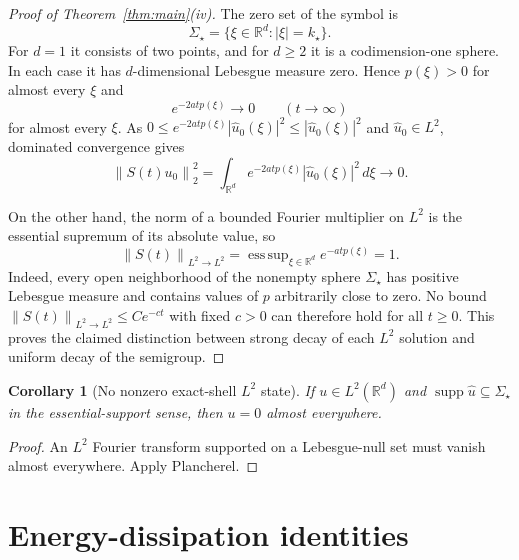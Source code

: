 \documentclass[11pt]{article}
\newtheorem{corollary}[theorem]{Corollary}
\theoremstyle{remark}
\newcommand{\R}{\mathbb{R}}
\newcommand{\norm}[1]{\left\lVert #1\right\rVert}
\newcommand{\abs}[1]{\left\lvert #1\right\rvert}
\DeclareMathOperator{\supp}{supp}
\DeclareMathOperator{\esssup}{ess\,sup}
\begin{document}
\begin{proof}[Proof of Theorem~\ref{thm:main}(iv)]
The zero set of the symbol is
\begin{equation}\label{eq:shell}
\Sigma_\star=\{\xi\in\R^d:\abs{\xi}=k_\star\}.
\end{equation}
For $d=1$ it consists of two points, and for $d\ge2$ it is a
codimension-one sphere.  In each case it has $d$-dimensional Lebesgue
measure zero.  Hence $p(\xi)>0$ for almost every $\xi$ and
\begin{equation}
e^{-2atp(\xi)}\longrightarrow0
\qquad(t\to\infty)
\end{equation}
for almost every $\xi$.  As
$0\le e^{-2atp(\xi)}\abs{\widehat u_0(\xi)}^2
\le\abs{\widehat u_0(\xi)}^2$ and $\widehat u_0\in L^2$, dominated
convergence gives
\begin{equation}
\norm{S(t)u_0}_2^2
=\int_{\R^d}e^{-2atp(\xi)}\abs{\widehat u_0(\xi)}^2\,d\xi
\longrightarrow0.
\end{equation}

On the other hand, the norm of a bounded Fourier multiplier on $L^2$
is the essential supremum of its absolute value, so
\begin{equation}
\norm{S(t)}_{L^2\to L^2}
=\esssup_{\xi\in\R^d}e^{-atp(\xi)}=1.
\end{equation}
Indeed, every open neighborhood of the nonempty sphere $\Sigma_\star$
has positive Lebesgue measure and contains values of $p$ arbitrarily
close to zero.  No bound
$\norm{S(t)}_{L^2\to L^2}\le C e^{-ct}$ with fixed $c>0$ can therefore
hold for all $t\ge0$.  This proves the claimed distinction between
strong decay of each $L^2$ solution and uniform decay of the semigroup.
\end{proof}

\begin{corollary}[No nonzero exact-shell $L^2$ state]
If $u\in L^2(\R^d)$ and
$\supp\widehat u\subseteq\Sigma_\star$ in the essential-support sense,
then $u=0$ almost everywhere.
\end{corollary}
\begin{proof}
An $L^2$ Fourier transform supported on a Lebesgue-null set must
vanish almost everywhere.  Apply Plancherel.
\end{proof}

\section{Energy-dissipation identities}
\end{document}
